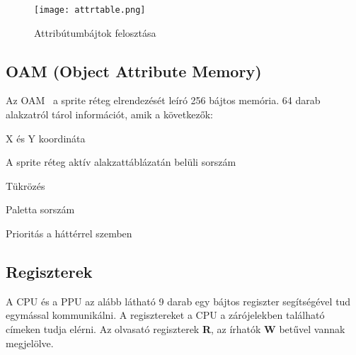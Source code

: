 \begin{figure}[H]
	\centering
	\texttt{[image: attrtable.png]}
	\caption{Attribútumbájtok felosztása}
	\label{fig:attr}
\end{figure}

\subsection{OAM (Object Attribute Memory)}

Az OAM~\cite{ppuref} a sprite réteg elrendezését leíró 256 bájtos memória. 64 darab alakzatról tárol információt, amik a következők:

\begin{compactitem}
	\item X és Y koordináta
	\item A sprite réteg aktív alakzattáblázatán belüli sorszám
	\item Tükrözés
	\item Paletta sorszám
	\item Prioritás a háttérrel szemben
\end{compactitem}

\subsection{Regiszterek}

A CPU és a PPU az alább látható 9 darab egy bájtos regiszter segítségével tud egymással kommunikálni. \cite{ppuref} A regisztereket a CPU a zárójelekben található címeken tudja elérni.
Az olvasató regiszterek \textbf{R}, az írhatók \textbf{W} betűvel vannak megjelölve.

\vspace{0.25cm}

